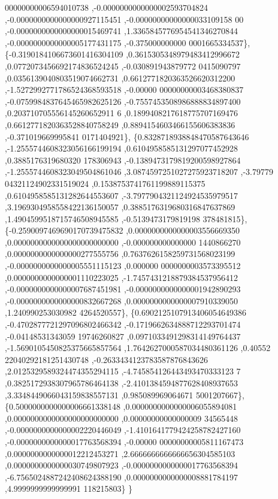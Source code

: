 \begin{DoxyCode}
      00000000006594010738 ,-0.0000000000000002593704824 ,-0.0000000000000000927115451 ,-0.00000000000000033109158
      00 ,-0.0000000000000000015469741 ,1.3365845776954541346270844 ,-0.0000000000000005177431175 ,-0.375000000000
      0001665334537\},
\{-0.3190184106673601416304109 ,0.3615305348979483412996672 ,0.0772073456692174836524245 ,-0.030891943879772
      0415090797 ,0.0356139040803519074662731 ,0.6612771820363526620312200 ,-1.5272992771786524368593518 ,-0.00000
      00000000003468380837 ,-0.0759984837645465982625126 ,-0.7557453508986888834897400 ,0.203710705556145260652911
      6 ,0.1899408217618775707169476 ,0.6612771820363528840758249 ,0.8894154603466155606383836 ,-0.371019669995841
      0171404921\},
\{0.8328718938848470587643646 ,-1.2555744608323056166199194 ,0.6104958585131297077452928 ,0.3885176319680320
      178306943 ,-0.1389473179819200598927864 ,-1.2555744608323049504861046 ,3.0874597251027275923718207 ,-3.79779
      04321124902331519024 ,0.1538753741761199889115375 ,0.6104958585131282644553607 ,-3.7977904321124924535979517
       ,3.1969304958558422136150057 ,0.3885176319680316847637869 ,1.4904599518715746508945585 ,-0.5139473179819198
      378481815\},
\{-0.2590097469690170739475832 ,0.0000000000000003556669350 ,0.0000000000000000000000000 ,-0.000000000000000
      1440866270 ,0.0000000000000000277555756 ,0.7637626158259731568023199 ,-0.0000000000000005551115123 ,0.000000
      0000000003573395512 ,0.0000000000000001110223025 ,-1.7457431218879384537956412 ,-0.0000000000000007687451981
       ,-0.0000000000000001942890293 ,-0.0000000000000000832667268 ,0.0000000000000007910339050 ,1.240990253030982
      4264520557\},
\{0.6902125107913406054649386 ,-0.4702877721297096802466342 ,-0.1719662634888712293701474 ,-0.04148531343059
      19746260827 ,0.0971033491298314149764437 ,-1.5690105450825375665857564 ,1.7642627000587034480361126 ,0.40552
      22040292181251430748 ,-0.2633434123783587876843626 ,2.0125329589324474355294115 ,-4.745854126443493470333123
      7 ,0.3825172938307965786464138 ,-2.4101384594877628408937653 ,3.3348449066043159838557131 ,0.985089969064671
      5001207667\},
\{0.5000000000000006661338148 ,0.0000000000000006055894081 ,0.0000000000000000000000000 ,0.00000000000000009
      34565448 ,-0.0000000000000002220446049 ,-1.4101641779424258782427160 ,-0.0000000000000017763568394 ,-0.00000
      00000000005811167473 ,0.0000000000000012212453271 ,2.6666666666666656304585103 ,0.0000000000000030749807923 
      ,-0.0000000000000017763568394 ,-6.7565024887242408624388190 ,0.0000000000000008881784197 ,4.9999999999999991
      118215803\}
\}
\end{DoxyCode}
\mbox{\label{a00996_a3c392967c3ca27052f6c93c84b7b989e}} 
